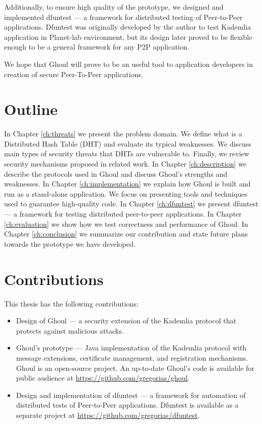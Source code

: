 Additionally, to ensure high quality of the prototype, we designed and
implemented dfuntest --- a framework for distributed testing of Peer-to-Peer
applications.
Dfuntest was originally developed by the author to test Kademlia application in
Planet-lab environment, but its design later proved to be flexible enough to be
a general framework for any P2P application.

We hope that Ghoul will prove to be an useful tool to application developers in
creation of secure Peer-To-Peer applications.

\section{Outline}
In Chapter \ref{ch:threats} we present the problem domain.
We define what is a Distributed Hash Table (DHT) and evaluate its typical
weaknesses.
We discuss main types of security threats that DHTs are vulnerable to.
Finally, we review security mechanisms proposed in related work.
In Chapter \ref{ch:description} we describe the protocols used in Ghoul and
discuss Ghoul's strengths and weaknesses.
In Chapter \ref{ch:implementation} we explain how Ghoul is built and run as a
stand-alone application.
We focus on presenting tools and techniques used to guarantee high-quality code.
In Chapter \ref{ch:dfuntest} we present dfuntest --- a framework for testing
distributed peer-to-peer applications.
In Chapter \ref{ch:evaluation} we show how we test correctness and
performance of Ghoul.
In Chapter \ref{ch:conclusion} we summarize our contribution and state future
plans towards the prototype we have developed.

\section{Contributions}
This thesis has the following contributions:
\begin{itemize}
  \item Design of Ghoul --- a security extension of the Kademlia protocol that
    protects against malicious attacks.
  \item Ghoul's prototype --- Java implementation of the Kademlia protocol with
    message extensions, certificate management, and registration mechanisms.
    Ghoul is an open-source project.
    An up-to-date Ghoul's code is available for public audience at \url{https://github.com/gregorias/ghoul}.
  \item Design and implementation of dfuntest --- a framework for automation of
    distributed tests of Peer-to-Peer applications.
    Dfuntest is available as a separate project at
    \url{https://github.com/gregorias/dfuntest}.
\end{itemize}
